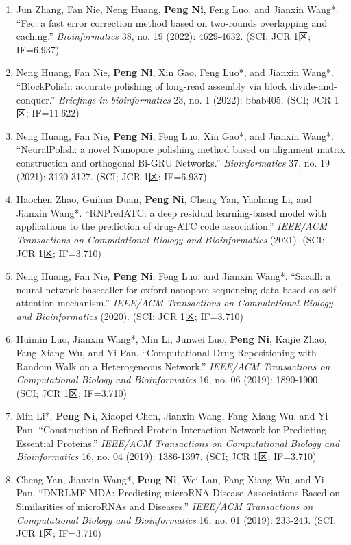 \documentclass[zh]{resume}
\begin{document}
\begin{itemize}
\begin{enumerate}
    \item Jun Zhang, Fan Nie, Neng Huang, \textbf{Peng Ni}, Feng Luo, and Jianxin Wang*. \enquote{Fec: a fast error correction method based on two-rounds overlapping and caching.} {\it Bioinformatics} 38, no. 19 (2022): 4629-4632. (SCI; JCR 1区; IF=6.937)
    \item Neng Huang, Fan Nie, \textbf{Peng Ni}, Xin Gao, Feng Luo*, and Jianxin Wang*. \enquote{BlockPolish: accurate polishing of long-read assembly via block divide-and-conquer.} {\it Briefings in bioinformatics} 23, no. 1 (2022): bbab405. (SCI; JCR 1区; IF=11.622)
    \item Neng Huang, Fan Nie, \textbf{Peng Ni}, Feng Luo, Xin Gao*, and Jianxin Wang*. \enquote{NeuralPolish: a novel Nanopore polishing method based on alignment matrix construction and orthogonal Bi-GRU Networks.} {\it Bioinformatics} 37, no. 19 (2021): 3120-3127. (SCI; JCR 1区; IF=6.937)
    \item Haochen Zhao, Guihua Duan, \textbf{Peng Ni}, Cheng Yan, Yaohang Li, and Jianxin Wang*. \enquote{RNPredATC: a deep residual learning-based model with applications to the prediction of drug-ATC code association.} {\it IEEE/ACM Transactions on Computational Biology and Bioinformatics} (2021). (SCI; JCR 1区; IF=3.710)
    \item Neng Huang, Fan Nie, \textbf{Peng Ni}, Feng Luo, and Jianxin Wang*. \enquote{Sacall: a neural network basecaller for oxford nanopore sequencing data based on self-attention mechanism.} {\it IEEE/ACM Transactions on Computational Biology and Bioinformatics} (2020). (SCI; JCR 1区; IF=3.710)
    \item Huimin Luo, Jianxin Wang*, Min Li, Junwei Luo, \textbf{Peng Ni}, Kaijie Zhao, Fang-Xiang Wu, and Yi Pan. \enquote{Computational Drug Repositioning with Random Walk on a Heterogeneous Network.} {\it IEEE/ACM Transactions on Computational Biology and Bioinformatics} 16, no. 06 (2019): 1890-1900. (SCI; JCR 1区; IF=3.710)
    \item Min Li*, \textbf{Peng Ni}, Xiaopei Chen, Jianxin Wang, Fang-Xiang Wu, and Yi Pan. \enquote{Construction of Refined Protein Interaction Network for Predicting Essential Proteins.} {\it IEEE/ACM Transactions on Computational Biology and Bioinformatics} 16, no. 04 (2019): 1386-1397. (SCI; JCR 1区; IF=3.710)
    \item Cheng Yan, Jianxin Wang*, \textbf{Peng Ni}, Wei Lan, Fang-Xiang Wu, and Yi Pan. \enquote{DNRLMF-MDA: Predicting microRNA-Disease Associations Based on Similarities of microRNAs and Diseases.} {\it IEEE/ACM Transactions on Computational Biology and Bioinformatics} 16, no. 01 (2019): 233-243. (SCI; JCR 1区; IF=3.710)
  \end{enumerate}
\end{itemize}
\end{document}
